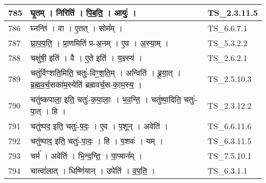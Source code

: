 \documentclass[17pt]{extarticle}
\begin{document}
\begin{longtable}{||p{0.4in}||p{4.9in}||p{0.9in}||}
    \hline
        
    785 & घृ॒तम्   ।   निरिति॑   ।   पि॒ब॒ति॒   ।   आयुः॑   ।    & TS\_2.3.11.5       \\
    
    \hline
        
    786 & घ्नन्ति॑   ।   वा   ।   ए॒तत्   ।   सोम᳚म्   ।    & TS\_6.6.7.1       \\
    
    \hline
        
    787 & घ्रा॒प॒य॒ति॒   ।   प्रा॒णमिति॑ प्र{-}अ॒नम्   ।   ए॒व   ।   अ॒स्या॒म्   ।    & TS\_5.3.2.2       \\
    
    \hline
        
    788 & चक्षु॑षी॒ इति॑   ।   वै   ।   ए॒ते इति॑   ।   य॒ज्ञ्स्य॑   ।    & TS\_2.6.2.1       \\
    
    \hline
        
    789 & चतु॑र्विꣳशति॒मिति॒ चतुः॑{-}विꣳ॒॒श॒ति॒म्   ।   अन्विति॑   ।   ब्रू॒या॒त्   ।   ब्र॒ह्म॒व॒र्च॒सका॑म॒स्येति॑ ब्रह्मवर्च॒स{-}का॒म॒स्य॒   ।    & TS\_2.5.10.3       \\
    
    \hline
        
    790 & चतु॑ष्कपाला॒ इति॒ चतुः॑{-}क॒पा॒लाः॒   ।   भ॒व॒न्ति॒   ।   चतु॑ष्पा॒दिति॒ चतुः॑{-}पा॒त्   ।   हि   ।    & TS\_2.3.12.2       \\
    
    \hline
        
    791 & चतु॑ष्पद॒ इति॒ चतुः॑{-}प॒दः॒   ।   ए॒व   ।   प॒शून्   ।   अवेति॑   ।    & TS\_6.6.11.6       \\
    
    \hline
        
    792 & चतु॑ष्पाद॒ इति॒ चतुः॑{-}पा॒दः॒   ।   हि   ।   प॒शवः॑   ।   यम्   ।    & TS\_6.3.11.5       \\
    
    \hline
        
    793 & चर्म॑   ।   अवेति॑   ।   भि॒न्द॒न्ति॒   ।   पा॒प्मान᳚म्   ।    & TS\_7.5.10.1       \\
    
    \hline
        
    794 & चात्वा॑लात्   ।   धिष्णि॑यान्   ।   उपेति॑   ।   व॒प॒ति॒   ।    & TS\_6.3.1.1       \\
    
    \hline
        

\end{longtable}
\end{document}
